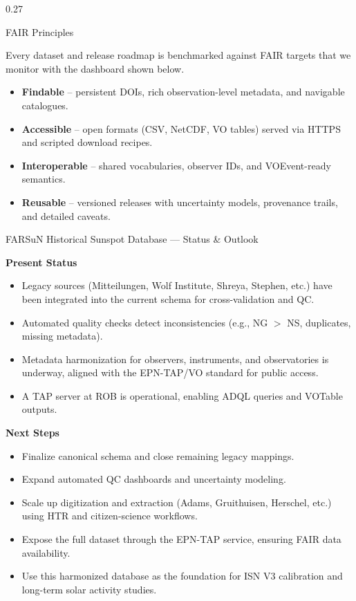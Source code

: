 \documentclass[final]{beamer}
\newenvironment{tightblock}[1]{%
  \begin{block}{#1}\vspace{0.35em}
}{\end{block}}
\begin{document}
\begin{frame}[t]
\begin{columns}[t,totalwidth=0.98\paperwidth]
\begin{column}{0.27\paperwidth}
\begin{tightblock}{FAIR Principles}
  Every dataset and release roadmap is benchmarked against FAIR targets that we monitor with the dashboard shown below.

\begin{itemize}
  \item \textbf{Findable} – persistent DOIs, rich observation-level metadata, and navigable catalogues.
  \item \textbf{Accessible} – open formats (CSV, NetCDF, VO tables) served via HTTPS and scripted download recipes.
  \item \textbf{Interoperable} – shared vocabularies, observer IDs, and VOEvent-ready semantics.
  \item \textbf{Reusable} – versioned releases with uncertainty models, provenance trails, and detailed caveats.
\end{itemize}
\end{tightblock}
\begin{tightblock}{FARSuN Historical Sunspot Database — Status \& Outlook}
  \textbf{Present Status}
  \begin{itemize}
    \item Legacy sources (Mitteilungen, Wolf Institute, Shreya, Stephen, etc.) have been integrated into the current schema for cross-validation and QC.
    \item Automated quality checks detect inconsistencies (e.g., NG $>$ NS, duplicates, missing metadata).
    \item Metadata harmonization for observers, instruments, and observatories is underway, aligned with the EPN-TAP/VO standard for public access.
    \item A TAP server at ROB is operational, enabling ADQL queries and VOTable outputs.
  \end{itemize}

  \textbf{Next Steps}
  \begin{itemize}
    \item Finalize canonical schema and close remaining legacy mappings.
    \item Expand automated QC dashboards and uncertainty modeling.
    \item Scale up digitization and extraction (Adams, Gruithuisen, Herschel, etc.) using HTR and citizen-science workflows.
    \item Expose the full dataset through the EPN-TAP service, ensuring FAIR data availability.
    \item Use this harmonized database as the foundation for ISN V3 calibration and long-term solar activity studies.
  \end{itemize}


\end{tightblock}
\end{column}
\end{columns}
\end{frame}
\end{document}
